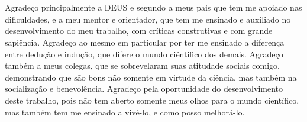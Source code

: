 \section*{} 
Agradeço principalmente a DEUS e segundo a meus pais que tem me apoiado nas dificuldades, e a meu mentor e orientador, que tem me ensinado e auxiliado no desenvolvimento do meu trabalho, com críticas construtivas e com grande sapiência. Agradeço ao mesmo em particular por ter me ensinado a diferença entre dedução e indução, que difere o mundo ciêntifico dos demais. Agradeço também a meus colegas, que se sobrevelaram suas atitudade sociais comigo, demonstrando que são bons não somente em virtude da ciência, mas também na socialização e benevolência. Agradeço pela oportunidade do desenvolvimento deste trabalho, pois não tem aberto somente meus olhos para o mundo científico, mas também tem me ensinado a vivê-lo, e como posso melhorá-lo.